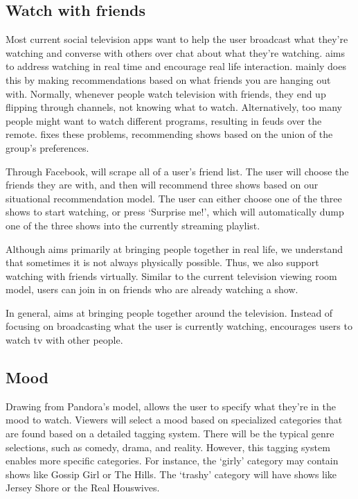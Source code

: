 \subsection{Watch with friends}
Most current social television apps want to help the user broadcast
what they’re watching and converse with others over chat about what
they’re watching.  {\sys} aims to address watching in real time and
encourage real life interaction.  {\sys} mainly does this by making
recommendations based on what friends you are hanging out with.
Normally, whenever people watch television with friends, they end up
flipping through channels, not knowing what to watch.  Alternatively,
too many people might want to watch different programs, resulting in
feuds over the remote.  {\sys} fixes these problems, recommending
shows based on the union of the group’s preferences.

Through Facebook, {\sys} will scrape all of a user’s friend list.  The
user will choose the friends they are with, and then {\sys} will
recommend three shows based on our situational recommendation model.
The user can either choose one of the three shows to start watching,
or press ‘Surprise me!’, which will automatically dump one of the
three shows into the currently streaming playlist.

Although {\sys} aims primarily at bringing people together in real
life, we understand that sometimes it is not always physically
possible.  Thus, we also support watching with friends virtually.
Similar to the current television viewing room model, users can join
in on friends who are already watching a show.

In general, {\sys} aims at bringing people together around the
television.  Instead of focusing on broadcasting what the user is
currently watching, {\sys} encourages users to watch tv with other
people.

\subsection{Mood}
Drawing from Pandora’s model, {\sys} allows the user to specify what
they’re in the mood to watch.  Viewers will select a mood based on
specialized categories that are found based on a detailed tagging
system.  There will be the typical genre selections, such as comedy,
drama, and reality.  However, this tagging system enables more
specific categories.  For instance, the ‘girly’ category may contain
shows like Gossip Girl or The Hills.  The ‘trashy’ category will have
shows like Jersey Shore or the Real Houswives.

